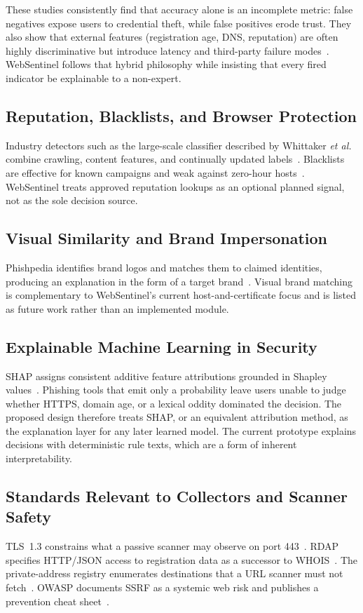 \documentclass[conference]{IEEEtran}
\begin{document}
These studies consistently find that accuracy alone is an incomplete metric: false negatives expose users to credential theft, while false positives erode trust. They also show that external features (registration age, DNS, reputation) are often highly discriminative but introduce latency and third-party failure modes~\cite{hannousse2021benchmark}. WebSentinel follows that hybrid philosophy while insisting that every fired indicator be explainable to a non-expert.

\subsection{Reputation, Blacklists, and Browser Protection}
Industry detectors such as the large-scale classifier described by Whittaker \emph{et al.} combine crawling, content features, and continually updated labels~\cite{whittaker2010large}. Blacklists are effective for known campaigns and weak against zero-hour hosts~\cite{marchal2014phishstorm,apwg2024q4}. WebSentinel treats approved reputation lookups as an optional planned signal, not as the sole decision source.

\subsection{Visual Similarity and Brand Impersonation}
Phishpedia identifies brand logos and matches them to claimed identities, producing an explanation in the form of a target brand~\cite{lin2021phishpedia}. Visual brand matching is complementary to WebSentinel's current host-and-certificate focus and is listed as future work rather than an implemented module.

\subsection{Explainable Machine Learning in Security}
SHAP assigns consistent additive feature attributions grounded in Shapley values~\cite{lundberg2017shap}. Phishing tools that emit only a probability leave users unable to judge whether HTTPS, domain age, or a lexical oddity dominated the decision. The proposed design therefore treats SHAP, or an equivalent attribution method, as the explanation layer for any later learned model. The current prototype explains decisions with deterministic rule texts, which are a form of inherent interpretability.

\subsection{Standards Relevant to Collectors and Scanner Safety}
TLS~1.3 constrains what a passive scanner may observe on port 443~\cite{rfc8446}. RDAP specifies HTTP/JSON access to registration data as a successor to WHOIS~\cite{rfc7480}. The private-address registry enumerates destinations that a URL scanner must not fetch~\cite{rfc1918}. OWASP documents SSRF as a systemic web risk and publishes a prevention cheat sheet~\cite{owasp2021top10,owaspssrf}.
\end{document}
